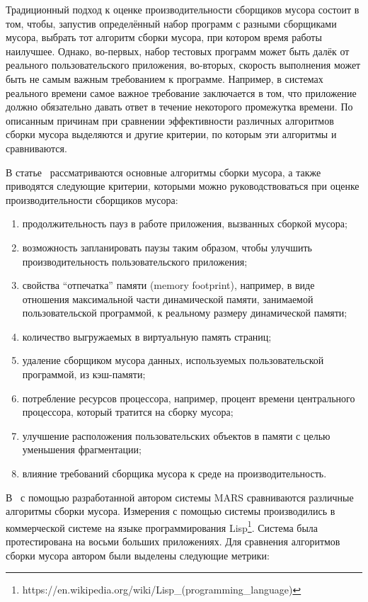 Традиционный подход к оценке производительности сборщиков мусора состоит в том, чтобы,
запустив определённый набор программ с разными сборщиками мусора, выбрать тот 
алгоритм сборки мусора, при котором время работы наилучшее. Однако, во-первых, набор
тестовых программ может быть далёк от реального пользовательского приложения, во-вторых,
скорость выполнения может быть не самым важным требованием к программе. Например, в системах
реального времени самое важное требование заключается в том, что приложение должно
обязательно давать ответ в течение некоторого промежутка времени. По описанным причинам
при сравнении эффективности различных алгоритмов сборки мусора выделяются и другие критерии,
по которым эти алгоритмы и сравниваются. 

В статье~\cite{book:goetz} рассматриваются основные алгоритмы сборки мусора, а также 
приводятся следующие критерии, которыми можно руководствоваться при оценке производительности
сборщиков мусора:

\begin{enumerate}
\item продолжительность пауз в работе приложения, вызванных сборкой мусора;
\item возможность запланировать паузы таким образом, чтобы улучшить производительность 
пользовательского приложения;
\item свойства ``отпечатка'' памяти (memory footprint), например, в виде отношения максимальной части динамической 
памяти, занимаемой пользовательской программой, к реальному размеру динамической памяти;
\item количество выгружаемых в виртуальную память страниц;
\item удаление сборщиком мусора данных, используемых пользовательской программой, из кэш-памяти;
\item потребление ресурсов процессора, например, процент времени центрального процессора,
который тратится на сборку мусора;
\item улучшение расположения пользовательских объектов в памяти с целью уменьшения 
фрагментации;
\item влияние требований сборщика мусора к среде на производительность. 
\end{enumerate}

В~\cite{book:Zorn} с помощью разработанной автором системы MARS сравниваются различные 
алгоритмы сборки мусора. Измерения с помощью системы производились в коммерческой системе на языке
программирования Lisp\footnote{https://en.wikipedia.org/wiki/Lisp\_(programming\_language)}.
Система была протестирована на восьми больших приложениях. Для сравнения алгоритмов сборки мусора 
автором были выделены следующие метрики:

